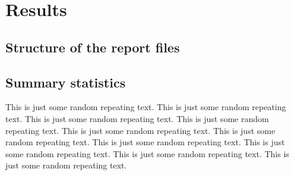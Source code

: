 \documentclass[fleqn,10pt]{SelfArx}\usepackage[]{graphicx}\usepackage[]{color}
\begin{document}
\section{Results}
\lipsum[1]

\subsection{Structure of the report files}
\lipsum[1]

\subsection{Summary statistics}
This is just some random repeating text. This is just some random repeating text. This is just some random repeating text. This is just some random repeating text. This is just some random repeating text. This is just some random repeating text. This is just some random repeating text. This is just some random repeating text. This is just some random repeating text. This is just some random repeating text.
\end{document}
